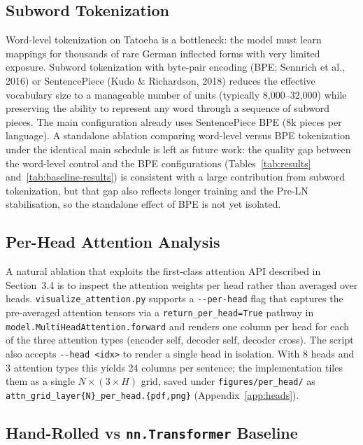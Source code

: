 \documentclass[10pt]{article}
\begin{document}
\subsection{Subword Tokenization}

Word-level tokenization on Tatoeba is a bottleneck: the model must learn mappings for thousands of rare German inflected forms with very limited exposure. Subword tokenization with byte-pair encoding (BPE; Sennrich et al., 2016) or SentencePiece (Kudo \& Richardson, 2018) reduces the effective vocabulary size to a manageable number of units (typically 8,000--32,000) while preserving the ability to represent any word through a sequence of subword pieces. The main configuration already uses SentencePiece BPE (8k pieces per language). A standalone ablation comparing word-level versus BPE tokenization under the identical main schedule is left as future work: the quality gap between the word-level control and the BPE configurations (Tables~\ref{tab:results} and~\ref{tab:baseline-results}) is consistent with a large contribution from subword tokenization, but that gap also reflects longer training and the Pre-LN stabilisation, so the standalone effect of BPE is not yet isolated.

\subsection{Per-Head Attention Analysis}

A natural ablation that exploits the first-class attention API described in Section~3.4 is to inspect the attention weights per head rather than averaged over heads. \texttt{visualize\_attention.py} supports a \texttt{-{}-per-head} flag that captures the pre-averaged attention tensors via a \texttt{return\_per\_head=True} pathway in \texttt{model.MultiHeadAttention.forward} and renders one column per head for each of the three attention types (encoder self, decoder self, decoder cross). The script also accepts \texttt{-{}-head <idx>} to render a single head in isolation. With 8 heads and 3 attention types this yields 24 columns per sentence; the implementation tiles them as a single $N \times (3 \times H)$ grid, saved under \texttt{figures/per\_head/} as \texttt{attn\_grid\_layer\{N\}\_per\_head.\{pdf,png\}} (Appendix~\ref{app:heads}).

\subsection{Hand-Rolled vs \texttt{nn.Transformer} Baseline}
\end{document}
